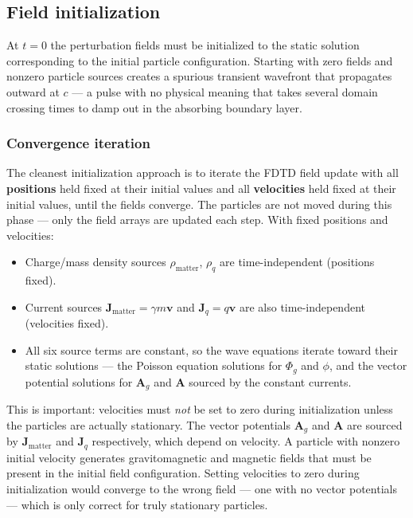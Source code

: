\documentclass[11pt,a4paper]{article}
\newcommand{\vv}[1]{\mathbf{#1}}
\newcommand{\Phig}{\Phi_g}
\newcommand{\Ag}{\vv{A}_g}
\begin{document}
\subsection{Field initialization}
\label{sec:init}

At $t=0$ the perturbation fields must be initialized to the static solution corresponding to the initial particle configuration.  Starting with zero fields and nonzero particle sources creates a spurious transient wavefront that propagates outward at $c$ --- a pulse with no physical meaning that takes several domain crossing times to damp out in the absorbing boundary layer.

\subsubsection*{Convergence iteration}

The cleanest initialization approach is to iterate the FDTD field update with all \textbf{positions} held fixed at their initial values and all \textbf{velocities} held fixed at their initial values, until the fields converge.  The particles are not moved during this phase --- only the field arrays are updated each step.  With fixed positions and velocities:
\begin{itemize}
  \item Charge/mass density sources $\rho_{\mathrm{matter}}$, $\rho_q$ are time-independent (positions fixed).
  \item Current sources $\vv{J}_{\mathrm{matter}} = \gamma m\vv{v}$ and $\vv{J}_q = q\vv{v}$ are also time-independent (velocities fixed).
  \item All six source terms are constant, so the wave equations iterate toward their static solutions --- the Poisson equation solutions for $\Phig$ and $\phi$, and the vector potential solutions for $\Ag$ and $\vv{A}$ sourced by the constant currents.
\end{itemize}
This is important: velocities must \emph{not} be set to zero during initialization unless the particles are actually stationary.  The vector potentials $\Ag$ and $\vv{A}$ are sourced by $\vv{J}_{\mathrm{matter}}$ and $\vv{J}_q$ respectively, which depend on velocity.  A particle with nonzero initial velocity generates gravitomagnetic and magnetic fields that must be present in the initial field configuration.  Setting velocities to zero during initialization would converge to the wrong field --- one with no vector potentials --- which is only correct for truly stationary particles.
\end{document}
